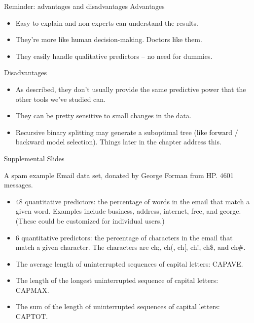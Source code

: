 \documentclass[mathserif, aspectratio=169]{beamer}
\begin{document}
\begin{frame}{Reminder: advantages and disadvantages}
Advantages

\begin{itemize}
\item Easy to explain and non-experts can understand the results.
\item They're more like human decision-making.  Doctors like them.
\item They easily handle qualitative predictors -- no need for dummies.
\end{itemize}

Disadvantages

\begin{itemize}
\item As described, they don't usually provide the same predictive power that the other tools we've studied can.
\item They can be pretty sensitive to small changes in the data. 
\item Recursive binary splitting may generate a suboptimal tree (like forward / backward model selection).  Things later in the chapter address this.
\end{itemize}
\end{frame}

\begin{frame}{Supplemental Slides}

\end{frame}


\begin{frame}{A spam example}
Email data set, donated by George Forman from HP.  4601 messages.  


\begin{itemize}
\item 48 quantitative predictors: the percentage of words in the email that match a given word. Examples include business, address, internet, free, and george. (These could be customized for individual users.)
\item 6 quantitative predictors: the percentage of characters in the email that match a given character. The characters are ch;, ch(, ch[, ch!, ch\$, and ch\#.
\item The average length of uninterrupted sequences of capital letters: CAPAVE.
\item The length of the longest uninterrupted sequence of capital letters: CAPMAX.
\item The sum of the length of uninterrupted sequences of capital letters: CAPTOT.
\end{itemize}

\end{frame}
\end{document}
